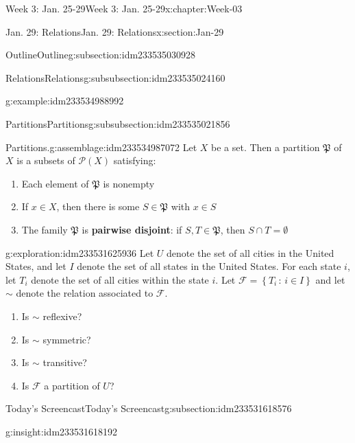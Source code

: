\documentclass[oneside,10pt,]{book}
\newcommand{\terminology}[1]{\textbf{#1}}
\numberwithin{equation}{section}
\newlength{\qrsize}
\newcommand{\setof}[2]{{\left\{#1\,\colon\,#2\right\}}}
\def\pow{{\mathcal P}}
\newcommand{\pow}{\mathcal P}
\begin{document}
\begin{chapterptx}{Week 3: Jan. 25-29}{}{Week 3: Jan. 25-29}{}{}{x:chapter:Week-03}
\begin{sectionptx}{Jan. 29: Relations}{}{Jan. 29: Relations}{}{}{x:section:Jan-29}
\begin{subsectionptx}{Outline}{}{Outline}{}{}{g:subsection:idm233535030928}
\begin{subsubsectionptx}{Relations}{}{Relations}{}{}{g:subsubsection:idm233535024160}
\begin{example}{}{g:example:idm233534988992}
\end{example}
\end{subsubsectionptx}
%
%
\typeout{************************************************}
\typeout{************************************************}
%
\begin{subsubsectionptx}{Partitions}{}{Partitions}{}{}{g:subsubsection:idm233535021856}
\begin{assemblage}{Partitions.}{g:assemblage:idm233534987072}%
Let \(X\) be a set. Then a partition \(\mathfrak{P}\) of \(X\) is a subsets of \(\pow(X)\) satisfying: %
\begin{enumerate}
\item{}Each element of \(\mathfrak{P}\) is nonempty%
\item{}If \(x\in X\), then there is some \(S\in \mathfrak{P}\) with \(x\in S\)%
\item{}The family \(\mathfrak{P}\) is \terminology{pairwise disjoint}: if \(S,T\in \mathfrak{P}\), then \(S\cap T = \emptyset\)%
\end{enumerate}
%
\end{assemblage}
\begin{exploration}{}{g:exploration:idm233531625936}%
Let \(U\) denote the set of all cities in the United States, and let \(I\) denote the set of all states in the United States. For each state \(i\), let \(T_i\) denote the set of all cities within the state \(i\). Let \(\mathcal{F} = \setof{T_i}{i\in I}\) and let \(\sim\) denote the relation associated to \(\mathcal{F}\).%
%
\begin{enumerate}
\item{}Is \(\sim\) reflexive?%
\item{}Is \(\sim\) symmetric?%
\item{}Is \(\sim\) transitive?%
\item{}Is \(\mathcal{F}\) a partition of \(U\)?%
\end{enumerate}
\end{exploration}%
\end{subsubsectionptx}
\end{subsectionptx}
%
%
\typeout{************************************************}
\typeout{************************************************}
%
\begin{subsectionptx}{Today's Screencast}{}{Today's Screencast}{}{}{g:subsection:idm233531618576}
\begin{insight}{}{g:insight:idm233531618192}%
\setlength{\qrsize}{9em}

\end{insight}
\end{subsectionptx}
\end{sectionptx}
\end{chapterptx}
\end{document}
